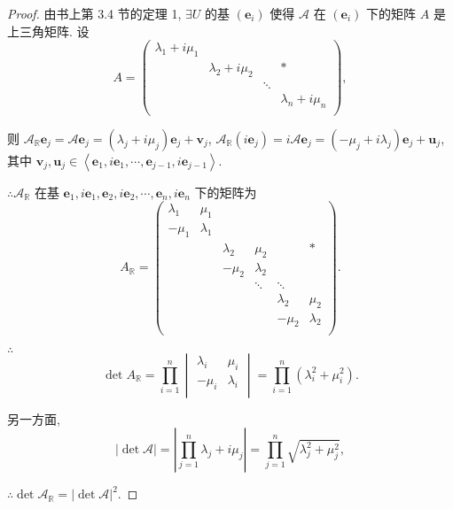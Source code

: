 \documentclass{ctexart}
\begin{document}
\begin{proof}
    由书上第 3.4 节的定理 1, $\exists U$ 的基 $(\boldsymbol{e}_i)$ 使得 $\mathcal{A}$ 在 $(\boldsymbol{e}_i)$ 下的矩阵 $A$ 是上三角矩阵. 设
    \[A=\begin{pmatrix}
        \lambda_1+i\mu_1 \\
        & \lambda_2+i\mu_2 && * \\
        && \ddots \\
        &&& \lambda_n+i\mu_n \\
    \end{pmatrix},\]

    则 $\mathcal{A}_\mathbb{R}\boldsymbol{e}_j=\mathcal{A}\boldsymbol{e}_j=(\lambda_j+i\mu_j)\boldsymbol{e}_j+\boldsymbol{v}_j$, $\mathcal{A}_\mathbb{R}(i\boldsymbol{e}_j)=i\mathcal{A}\boldsymbol{e}_j=(-\mu_j+i\lambda_j)\boldsymbol{e}_j+\boldsymbol{u}_j$, 其中 $\boldsymbol{v}_j,\boldsymbol{u}_j\in\left<\boldsymbol{e}_1,i\boldsymbol{e}_1,\cdots,\boldsymbol{e}_{j-1},i\boldsymbol{e}_{j-1}\right>$.
    
    $\therefore\mathcal{A}_\mathbb{R}$ 在基 $\boldsymbol{e}_1,i\boldsymbol{e}_1,\boldsymbol{e}_2,i\boldsymbol{e}_2,\cdots,\boldsymbol{e}_n,i\boldsymbol{e}_n$ 下的矩阵为
    \[A_\mathbb{R}=\begin{pmatrix}
        \lambda_1 & \mu_1 \\
        -\mu_1 & \lambda_1 \\
        && \lambda_2 & \mu_2 && * \\
        && -\mu_2 & \lambda_2 \\
        &&& \ddots & \ddots \\
        &&&& \lambda_2 & \mu_2 \\
        &&&& -\mu_2 & \lambda_2 \\
    \end{pmatrix}.\]

    $\therefore$
    \[\det A_\mathbb{R}=\prod\limits_{i=1}^n\begin{vmatrix}
        \lambda_i & \mu_i \\
        -\mu_i & \lambda_i \\
    \end{vmatrix}=\prod\limits_{i=1}^n(\lambda_i^2+\mu_i^2).\]

    另一方面,
    \[|\det\mathcal{A}|=\left|\prod\limits_{j=1}^n\lambda_j+i\mu_j\right|=\prod\limits_{j=1}^n\sqrt{\lambda_j^2+\mu_j^2},\]

    $\therefore\det\mathcal{A}_\mathbb{R}=|\det\mathcal{A}|^2$.
\end{proof}
\end{document}
